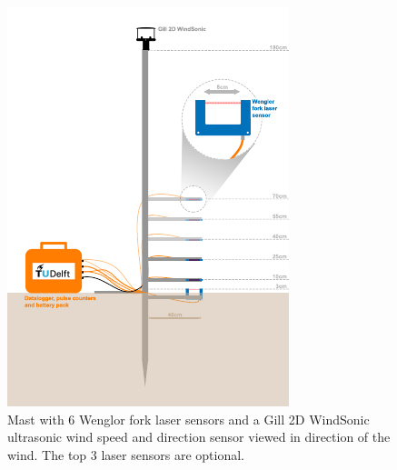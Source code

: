 \begin{figure}
 \centering
  \includegraphics[width=\columnwidth]{../Figures/mast_small}
  \caption{Mast with 6 Wenglor fork laser sensors and a Gill 2D
    WindSonic ultrasonic wind speed and direction sensor viewed in
    direction of the wind. The top 3 laser sensors are optional.}
  \label{fig:mast}
\end{figure}

